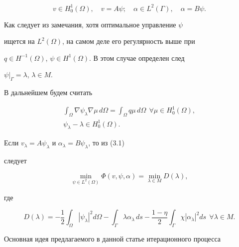 \begin{equation} 


v\in H^1_0(\Omega),\quad v=A\psi;\quad 


\alpha\in L^2(\Gamma),\quad \alpha=B\psi. 


\end{equation} 


Как следует из замечания, хотя оптимальное управление $\psi$ 


ищется на $L^2(\Omega)$, на самом деле его регулярность выше при 


$q\in H^{-1}(\Omega)$, $\psi\in H^1(\Omega)$. В этом случае определен след 


$\psi|_\Gamma=\lambda$, $\lambda\in M$. 


 


В дальнейшем будем считать 


\begin{gather*} 


\int_\Omega\nabla\psi_\lambda\nabla\mu\,d\Omega=\int_\Omega 


q\mu\,d\Omega\ \ \forall\mu\in H^1_0(\Omega),\\ 


\psi_\lambda-\lambda\in H^1_0(\Omega). 


\end{gather*} 


Если $v_\lambda=A\psi_\lambda$ и $\alpha_\lambda=B\psi_\lambda$, то из (3.1) 


следует 


\begin{equation} 


\min_{\psi\in L^2(\Omega)}\Phi(v,\psi,\alpha)= 


\min_{\lambda\in M}D(\lambda), 


\end{equation} 


где 


$$ 


D(\lambda)=-\frac{1}{2}\int_\Omega|\psi_\lambda|^2d\Omega- 


\int_\Gamma \lambda\alpha_\lambda\,ds-\frac{1-\eta}{2} 


\int_\Gamma\chi|\alpha_\lambda|^2ds\ \ \forall\lambda\in M. 


$$ 


 


Основная идея предлагаемого в данной статье итерационного процесса 


